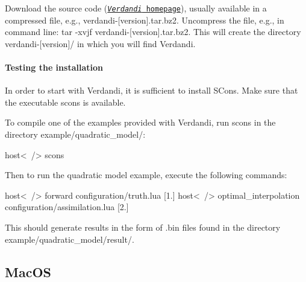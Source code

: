 \documentclass{tufte-book}
\begin{document}
\-Download the source code (\href{http://verdandi.gforge.inria.fr/}{\tt \-\emph{Verdandi} homepage}), usually available in a compressed file, e.\-g., verdandi-\/\mbox{[}version\mbox{]}.tar.\-bz2.
\-Uncompress the file, e.\-g., in command line\-: {\ttfamily tar -\/xvjf verdandi-\/\mbox{[}version\mbox{]}.tar.\-bz2}.
\-This will create the directory {\ttfamily verdandi-\/\mbox{[}version\mbox{]}/} in which you will find \-Verdandi.



\hypertarget{installation_tests_linux}{}\paragraph{\-Testing the installation}\label{installation_tests_linux}


\-In order to start with \-Verdandi, it is sufficient to install \-S\-Cons. \-Make sure that the executable {\ttfamily scons} is available.

\-To compile one of the examples provided with \-Verdandi, run {\ttfamily scons} in the directory {\ttfamily example/quadratic\-\_\-model/}\-:


\begin{frame_bash}
host<~/> scons
\end{frame_bash}


\-Then to run the quadratic model example, execute the following commands\-:

\begin{frame_bash}
host<~/> forward configuration/truth.lua [1.]
host<~/> optimal_interpolation configuration/assimilation.lua [2.]
\end{frame_bash}

\-This should generate results in the form of .bin files found in the directory {\ttfamily example/quadratic\-\_\-model/result/}.


\hypertarget{installation_macos}{}\subsection{\-Mac\-O\-S}\label{installation_macos}
\end{document}
